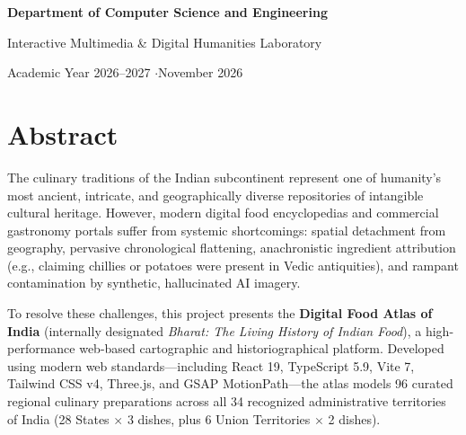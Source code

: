 \documentclass[11pt,a4paper]{report}
\begin{document}
\begin{titlepage}
    \vfill
    {\large \textbf{Department of Computer Science and Engineering}\par}
    {\large Interactive Multimedia \& Digital Humanities Laboratory\par}
    \vspace{0.5cm}
    {\large Academic Year 2026--2027 \quad$\cdot$\quad November 2026\par}
\end{titlepage}

\setcounter{page}{1}

\chapter*{Abstract}

The culinary traditions of the Indian subcontinent represent one of humanity's most ancient, intricate, and geographically diverse repositories of intangible cultural heritage. However, modern digital food encyclopedias and commercial gastronomy portals suffer from systemic shortcomings: spatial detachment from geography, pervasive chronological flattening, anachronistic ingredient attribution (e.g., claiming chillies or potatoes were present in Vedic antiquities), and rampant contamination by synthetic, hallucinated AI imagery.

To resolve these challenges, this project presents the \textbf{Digital Food Atlas of India} (internally designated \emph{Bharat: The Living History of Indian Food}), a high-performance web-based cartographic and historiographical platform. Developed using modern web standards---including React 19, TypeScript 5.9, Vite 7, Tailwind CSS v4, Three.js, and GSAP MotionPath---the atlas models 96 curated regional culinary preparations across all 34 recognized administrative territories of India (28 States $\times$ 3 dishes, plus 6 Union Territories $\times$ 2 dishes). 
\end{document}
